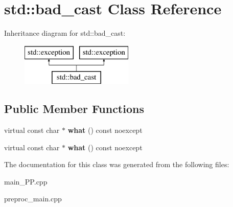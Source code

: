 \hypertarget{classstd_1_1bad__cast}{\section{std\+:\+:bad\+\_\+cast Class Reference}
\label{classstd_1_1bad__cast}
}
Inheritance diagram for std\+:\+:bad\+\_\+cast\+:\begin{figure}[H]
\begin{center}
\leavevmode
\includegraphics[height=2.000000cm]{classstd_1_1bad__cast}
\end{center}
\end{figure}
\subsection*{Public Member Functions}
\begin{DoxyCompactItemize}
\item 
\hypertarget{classstd_1_1bad__cast_a06dd9ba98e54d468ba243e7354c52714}{virtual const char $\ast$ {\bfseries what} () const noexcept}\label{classstd_1_1bad__cast_a06dd9ba98e54d468ba243e7354c52714}

\item 
\hypertarget{classstd_1_1bad__cast_a06dd9ba98e54d468ba243e7354c52714}{virtual const char $\ast$ {\bfseries what} () const noexcept}\label{classstd_1_1bad__cast_a06dd9ba98e54d468ba243e7354c52714}

\end{DoxyCompactItemize}


The documentation for this class was generated from the following files\+:\begin{DoxyCompactItemize}
\item 
main\+\_\+\+P\+P.\+cpp\item 
preproc\+\_\+main.\+cpp\end{DoxyCompactItemize}
